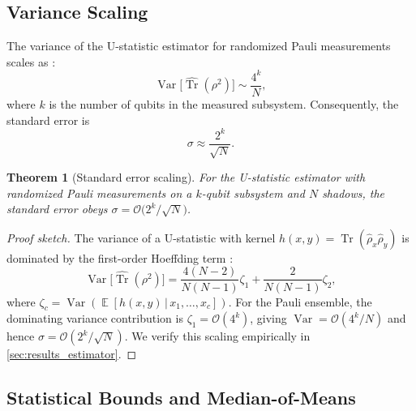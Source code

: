 \documentclass[12pt,a4paper,oneside]{book}
\theoremstyle{plain}
\newtheorem{theorem}{Theorem}[chapter]
\theoremstyle{definition}
\theoremstyle{remark}
\DeclareMathOperator{\Var}{Var}
\DeclareMathOperator{\E}{\mathbb{E}}
\begin{document}
\subsection{Variance Scaling}

The variance of the U-statistic estimator for randomized Pauli measurements scales as \cite{huang2020predicting, elben2020cross}:
\begin{equation}
    \label{eq:variance_scaling}
    \Var\bigl[\widehat{\operatorname{Tr}}(\rho^2)\bigr] \sim \frac{4^k}{N},
\end{equation}
where $k$ is the number of qubits in the measured subsystem. Consequently, the standard error is
\begin{equation}
    \label{eq:std_error}
    \sigma \approx \frac{2^k}{\sqrt{N}}.
\end{equation}

\begin{theorem}[Standard error scaling]\label{thm:std_error}
For the U-statistic estimator with randomized Pauli measurements on a $k$-qubit subsystem and $N$ shadows, the standard error obeys $\sigma = \mathcal{O}\bigl(2^k / \sqrt{N}\bigr)$.
\end{theorem}

\begin{proof}[Proof sketch]
The variance of a U-statistic with kernel $h(x,y) = \operatorname{Tr}(\hat{\rho}_x \hat{\rho}_y)$ is dominated by the first-order Hoeffding term \cite{hoeffding1948class}:
\begin{equation}
    \Var\bigl[\widehat{\operatorname{Tr}}(\rho^2)\bigr] = \frac{4(N-2)}{N(N-1)}\zeta_1 + \frac{2}{N(N-1)}\zeta_2,
\end{equation}
where $\zeta_c = \Var(\E[h(x,y) \,|\, x_1,\dots,x_c])$. For the Pauli ensemble, the dominating variance contribution is $\zeta_1 = \mathcal{O}(4^k)$, giving $\Var = \mathcal{O}(4^k/N)$ and hence $\sigma = \mathcal{O}(2^k/\sqrt{N})$. We verify this scaling empirically in \cref{sec:results_estimator}.
\end{proof}

\subsection{Statistical Bounds and Median-of-Means}
\end{document}
